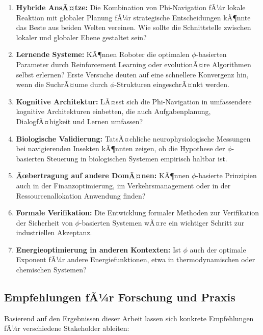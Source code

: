 ﻿\documentclass[a4paper,12pt]{article}
\theoremstyle{definition}
\begin{document}
\begin{enumerate}
	\item \textbf{Hybride AnsÃ¤tze:} Die Kombination von Phi-Navigation fÃ¼r lokale Reaktion mit globaler Planung fÃ¼r strategische Entscheidungen kÃ¶nnte das Beste aus beiden Welten vereinen. Wie sollte die Schnittstelle zwischen lokaler und globaler Ebene gestaltet sein?
	
	\item \textbf{Lernende Systeme:} KÃ¶nnen Roboter die optimalen $\phi$-basierten Parameter durch Reinforcement Learning oder evolutionÃ¤re Algorithmen selbst erlernen? Erste Versuche deuten auf eine schnellere Konvergenz hin, wenn die SuchrÃ¤ume durch $\phi$-Strukturen eingeschrÃ¤nkt werden.
	
	\item \textbf{Kognitive Architektur:} LÃ¤sst sich die Phi-Navigation in umfassendere kognitive Architekturen einbetten, die auch Aufgabenplanung, DialogfÃ¤higkeit und Lernen umfassen?
	
	\item \textbf{Biologische Validierung:} TatsÃ¤chliche neurophysiologische Messungen bei navigierenden Insekten kÃ¶nnten zeigen, ob die Hypothese der $\phi$-basierten Steuerung in biologischen Systemen empirisch haltbar ist.
	
	\item \textbf{Ãœbertragung auf andere DomÃ¤nen:} KÃ¶nnen $\phi$-basierte Prinzipien auch in der Finanzoptimierung, im Verkehrsmanagement oder in der Ressourcenallokation Anwendung finden?
	
	\item \textbf{Formale Verifikation:} Die Entwicklung formaler Methoden zur Verifikation der Sicherheit von $\phi$-basierten Systemen wÃ¤re ein wichtiger Schritt zur industriellen Akzeptanz.
	
	\item \textbf{Energieoptimierung in anderen Kontexten:} Ist $\phi$ auch der optimale Exponent fÃ¼r andere Energiefunktionen, etwa in thermodynamischen oder chemischen Systemen?
\end{enumerate}

\subsection{Empfehlungen fÃ¼r Forschung und Praxis}

Basierend auf den Ergebnissen dieser Arbeit lassen sich konkrete Empfehlungen fÃ¼r verschiedene Stakeholder ableiten:
\end{document}
